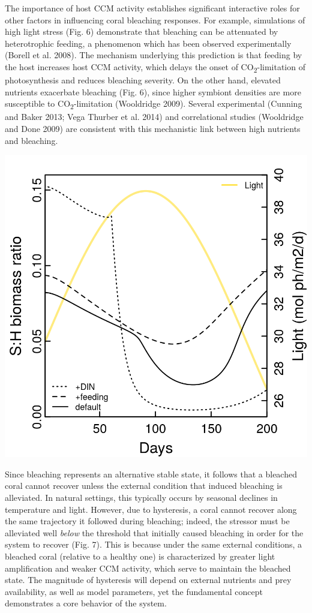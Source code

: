 \documentclass[]{elsarticle} %
\makeatletter
\def\maxwidth{\ifdim\Gin@nat@width>\linewidth\linewidth
\else\Gin@nat@width\fi}
\let\Oldincludegraphics\includegraphics
\renewcommand{\includegraphics}[1]{\Oldincludegraphics[width=\maxwidth]{#1}}
\makeatother
\begin{document}
The importance of host CCM activity establishes significant interactive
roles for other factors in influencing coral bleaching responses. For
example, simulations of high light stress (Fig. 6) demonstrate that
bleaching can be attenuated by heterotrophic feeding, a phenomenon which
has been observed experimentally (Borell et al. 2008). The mechanism
underlying this prediction is that feeding by the host increases host
CCM activity, which delays the onset of CO\textsubscript{2}-limitation
of photosynthesis and reduces bleaching severity. On the other hand,
elevated nutrients exacerbate bleaching (Fig. 6), since higher symbiont
densities are more susceptible to CO\textsubscript{2}-limitation
(Wooldridge 2009). Several experimental (Cunning and Baker 2013; Vega
Thurber et al. 2014) and correlational studies (Wooldridge and Done
2009) are consistent with this mechanistic link between high nutrients
and bleaching.

\includegraphics{../img/Fig6.png}

Since bleaching represents an alternative stable state, it follows that
a bleached coral cannot recover unless the external condition that
induced bleaching is alleviated. In natural settings, this typically
occurs by seasonal declines in temperature and light. However, due to
hysteresis, a coral cannot recover along the same trajectory it followed
during bleaching; indeed, the stressor must be alleviated well
\emph{below} the threshold that initially caused bleaching in order for
the system to recover (Fig. 7). This is because under the same external
conditions, a bleached coral (relative to a healthy one) is
characterized by greater light amplification and weaker CCM activity,
which serve to maintain the bleached state. The magnitude of hysteresis
will depend on external nutrients and prey availability, as well as
model parameters, yet the fundamental concept demonstrates a core
behavior of the system.
\end{document}
